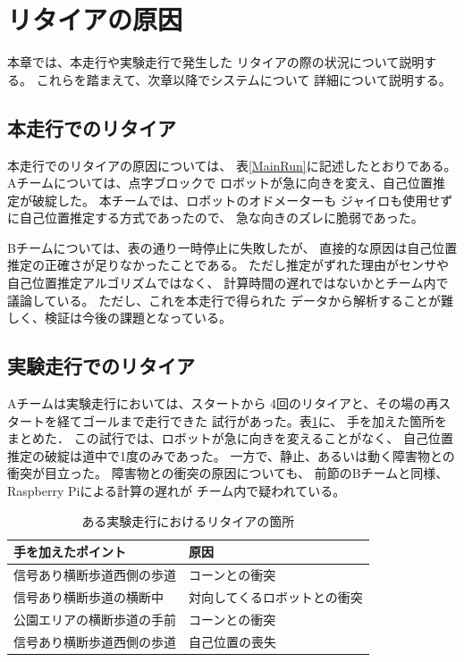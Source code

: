 \documentclass[twocolumn,9pt]{jsproceedings}
\begin{document}

\section{リタイアの原因}

本章では、本走行や実験走行で発生した
リタイアの際の状況について説明する。
これらを踏まえて、次章以降でシステムについて
詳細について説明する。

\subsection{本走行でのリタイア}\label{sub:retire}


本走行でのリタイアの原因については、
表\ref{MainRun}に記述したとおりである。
Aチームについては、点字ブロックで
ロボットが急に向きを変え、自己位置推定が破綻した。
本チームでは、ロボットのオドメーターも
ジャイロも使用せずに自己位置推定する方式であったので、
急な向きのズレに脆弱であった。

Bチームについては、表の通り一時停止に失敗したが、
直接的な原因は自己位置推定の正確さが足りなかったことである。
ただし推定がずれた理由がセンサや自己位置推定アルゴリズムではなく、
計算時間の遅れではないかとチーム内で議論している。
ただし、これを本走行で得られた
データから解析することが難しく、検証は今後の課題となっている。

\subsection{実験走行でのリタイア}


Aチームは実験走行においては、スタートから
4回のリタイアと、その場の再スタートを経てゴールまで走行できた
試行があった\cite{youtube}。表\ref{4hands}に、
手を加えた箇所をまとめた．
この試行では、ロボットが急に向きを変えることがなく、
自己位置推定の破綻は道中で1度のみであった。
一方で、静止、あるいは動く障害物との衝突が目立った。
障害物との衝突の原因についても、
前節のBチームと同様、
Raspberry Piによる計算の遅れが
チーム内で疑われている。

\begin{table}[h]
  \caption{ある実験走行におけるリタイアの箇所}
  \label{4hands}
	\begin{tabular}{|l|p{3.5cm}|}
    \hline
    手を加えたポイント & 原因 \\
    \hline
    信号あり横断歩道西側の歩道 & コーンとの衝突 \\
    \hline
    信号あり横断歩道の横断中 & 対向してくるロボットとの衝突 \\ 
    \hline
    公園エリアの横断歩道の手前 & コーンとの衝突 \\ 
    \hline
    信号あり横断歩道西側の歩道 & 自己位置の喪失 \\ 
    \hline
  \end{tabular}
\end{table}
\end{document}
